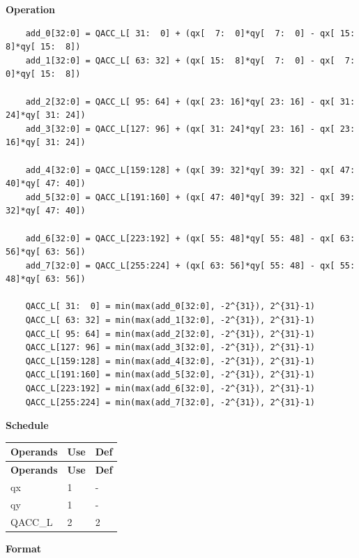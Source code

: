 \textbf{Operation}\\
\begin{lstlisting}
    add_0[32:0] = QACC_L[ 31:  0] + (qx[  7:  0]*qy[  7:  0] - qx[ 15:  8]*qy[ 15:  8])
    add_1[32:0] = QACC_L[ 63: 32] + (qx[ 15:  8]*qy[  7:  0] - qx[  7:  0]*qy[ 15:  8])

    add_2[32:0] = QACC_L[ 95: 64] + (qx[ 23: 16]*qy[ 23: 16] - qx[ 31: 24]*qy[ 31: 24])
    add_3[32:0] = QACC_L[127: 96] + (qx[ 31: 24]*qy[ 23: 16] - qx[ 23: 16]*qy[ 31: 24])

    add_4[32:0] = QACC_L[159:128] + (qx[ 39: 32]*qy[ 39: 32] - qx[ 47: 40]*qy[ 47: 40])
    add_5[32:0] = QACC_L[191:160] + (qx[ 47: 40]*qy[ 39: 32] - qx[ 39: 32]*qy[ 47: 40])

    add_6[32:0] = QACC_L[223:192] + (qx[ 55: 48]*qy[ 55: 48] - qx[ 63: 56]*qy[ 63: 56])
    add_7[32:0] = QACC_L[255:224] + (qx[ 63: 56]*qy[ 55: 48] - qx[ 55: 48]*qy[ 63: 56])

    QACC_L[ 31:  0] = min(max(add_0[32:0], -2^{31}), 2^{31}-1)
    QACC_L[ 63: 32] = min(max(add_1[32:0], -2^{31}), 2^{31}-1)
    QACC_L[ 95: 64] = min(max(add_2[32:0], -2^{31}), 2^{31}-1)
    QACC_L[127: 96] = min(max(add_3[32:0], -2^{31}), 2^{31}-1)
    QACC_L[159:128] = min(max(add_4[32:0], -2^{31}), 2^{31}-1)
    QACC_L[191:160] = min(max(add_5[32:0], -2^{31}), 2^{31}-1)
    QACC_L[223:192] = min(max(add_6[32:0], -2^{31}), 2^{31}-1)
    QACC_L[255:224] = min(max(add_7[32:0], -2^{31}), 2^{31}-1)

\end{lstlisting}

\textbf{Schedule}\\
\begin{longtable}[c]{|l|l|l|}
    \hline
    \rowcolor{lightgray}
    \textbf{Operands} & \textbf{Use} & \textbf{Def} \\\hline
    \endfirsthead
    \hline
    \rowcolor{lightgray}
     \textbf{Operands} & \textbf{Use} & \textbf{Def} \\\hline
    \endhead
    \hline
    \endfoot

     qx & 1 & - \\\hline
     qy & 1 & - \\\hline
     QACC\_L & 2 & 2

\end{longtable}

\textbf{Format}\\

